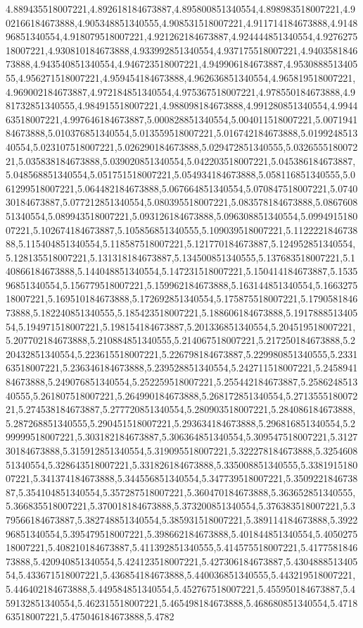 4.889435518007221,4.892618184673887,4.895800851340554,4.898983518007221,4.902166184673888,4.905348851340555,4.908531518007221,4.911714184673888,4.914896851340554,4.918079518007221,4.921262184673887,4.924444851340554,4.927627518007221,4.930810184673888,4.933992851340554,4.937175518007221,4.940358184673888,4.943540851340554,4.946723518007221,4.949906184673887,4.953088851340555,4.956271518007221,4.959454184673888,4.962636851340554,4.965819518007221,4.969002184673887,4.972184851340554,4.975367518007221,4.978550184673888,4.981732851340555,4.984915518007221,4.988098184673888,4.991280851340554,4.994463518007221,4.997646184673887,5.000828851340554,5.004011518007221,5.007194184673888,5.010376851340554,5.013559518007221,5.016742184673888,5.019924851340554,5.023107518007221,5.026290184673888,5.029472851340555,5.032655518007221,5.035838184673888,5.039020851340554,5.042203518007221,5.045386184673887,5.048568851340554,5.051751518007221,5.054934184673888,5.058116851340555,5.061299518007221,5.064482184673888,5.067664851340554,5.070847518007221,5.074030184673887,5.077212851340554,5.080395518007221,5.083578184673888,5.086760851340554,5.089943518007221,5.093126184673888,5.096308851340554,5.099491518007221,5.102674184673887,5.105856851340555,5.109039518007221,5.112222184673888,5.115404851340554,5.118587518007221,5.121770184673887,5.124952851340554,5.128135518007221,5.131318184673887,5.134500851340555,5.137683518007221,5.140866184673888,5.144048851340554,5.147231518007221,5.150414184673887,5.153596851340554,5.156779518007221,5.159962184673888,5.163144851340554,5.166327518007221,5.169510184673888,5.172692851340554,5.175875518007221,5.179058184673888,5.182240851340555,5.185423518007221,5.188606184673888,5.191788851340554,5.194971518007221,5.198154184673887,5.201336851340554,5.204519518007221,5.207702184673888,5.210884851340555,5.214067518007221,5.217250184673888,5.220432851340554,5.223615518007221,5.226798184673887,5.229980851340555,5.233163518007221,5.236346184673888,5.239528851340554,5.242711518007221,5.245894184673888,5.249076851340554,5.252259518007221,5.255442184673887,5.258624851340555,5.261807518007221,5.264990184673888,5.268172851340554,5.271355518007221,5.274538184673887,5.277720851340554,5.280903518007221,5.284086184673888,5.287268851340555,5.290451518007221,5.293634184673888,5.296816851340554,5.299999518007221,5.303182184673887,5.306364851340554,5.309547518007221,5.312730184673888,5.315912851340554,5.319095518007221,5.322278184673888,5.325460851340554,5.328643518007221,5.331826184673888,5.335008851340555,5.338191518007221,5.341374184673888,5.344556851340554,5.347739518007221,5.350922184673887,5.354104851340554,5.357287518007221,5.360470184673888,5.363652851340555,5.366835518007221,5.370018184673888,5.373200851340554,5.376383518007221,5.379566184673887,5.382748851340554,5.385931518007221,5.389114184673888,5.392296851340554,5.395479518007221,5.398662184673888,5.401844851340554,5.405027518007221,5.408210184673887,5.411392851340555,5.414575518007221,5.417758184673888,5.420940851340554,5.424123518007221,5.427306184673887,5.430488851340554,5.433671518007221,5.436854184673888,5.440036851340555,5.443219518007221,5.446402184673888,5.449584851340554,5.452767518007221,5.455950184673887,5.459132851340554,5.462315518007221,5.465498184673888,5.468680851340554,5.471863518007221,5.475046184673888,5.4782